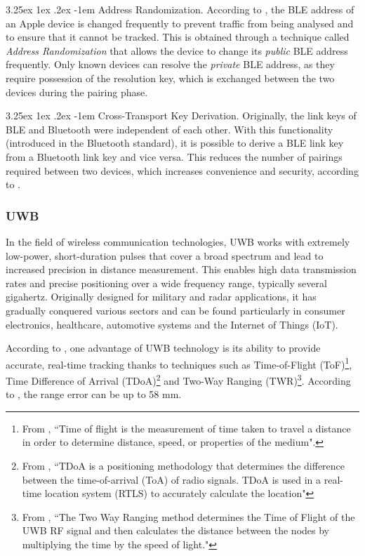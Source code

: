 \documentclass[english]{article}
\makeatletter
\newcounter{subsubsubsection}[subsubsection]
\renewcommand\paragraph{\@startsection{paragraph}{5}{\z@}%
  {3.25ex \@plus1ex \@minus.2ex}%
  {-1em}%
  {\normalfont\normalsize\bfseries}}
\makeatother
\begin{document}
\paragraph{Address Randomization.}\label{random} According to \cite{aps}, the BLE address of an Apple device is changed frequently to prevent traffic from being analysed and to ensure that it cannot be tracked. This is obtained through a technique called \textit{Address Randomization} that allows the device to change its \textit{public} BLE address frequently. Only known devices can resolve the \textit{private} BLE address, as they require possession of the resolution key, which is exchanged between the two devices during the pairing phase.

\paragraph{Cross-Transport Key Derivation.}
Originally, the link keys of BLE and Bluetooth were independent of each other. With this functionality (introduced in the Bluetooth standard), it is possible to derive a BLE link key from a Bluetooth link key and vice versa. This reduces the number of pairings required between two devices, which increases convenience and security, according to \cite{antonioli2022blurtooth}.

\subsubsection{UWB}\label{sec:uwb}
In the field of wireless communication technologies, UWB works with extremely low-power, short-duration pulses that cover a broad spectrum and lead to increased precision in distance measurement. This enables high data transmission rates and precise positioning over a wide frequency range, typically several gigahertz. Originally designed for military and radar applications, it has gradually conquered various sectors and can be found particularly in consumer electronics, healthcare, automotive systems and the Internet of Things (IoT).

According to \cite{article}, one advantage of UWB technology is its ability to provide accurate, real-time tracking thanks to techniques such as Time-of-Flight (ToF)\footnote{From \cite{tof}, ``Time of flight is the measurement of time taken to travel a distance in order to determine distance, speed, or properties of the medium".}, Time Difference of Arrival (TDoA)\footnote{From \cite{tdoa}, ``TDoA is a positioning methodology that determines the difference between the time-of-arrival (ToA) of radio signals. TDoA is used in a real-time location system (RTLS) to accurately calculate the location"} and Two-Way Ranging (TWR)\footnote{From \cite{twr}, ``The Two Way Ranging method determines the Time of Flight of the UWB RF signal and then calculates the distance between the nodes by multiplying the time by the speed of light."}. According to \cite{article}, the range error can be up to 58 mm.
\end{document}
